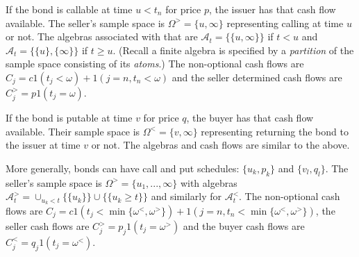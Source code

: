 \documentclass[12pt,letterpaper,fleqn]{report}
\begin{document}
If the bond is callable at time \(u < t_n\) for price \(p\), the issuer
has that cash flow available. The seller's sample space is \(\Omega^> = \{u,\infty\}\)
representing calling at time \(u\) or not. The algebras associated
with that are \(\mathcal{A}_t = \{\{u,\infty\}\}\) if \(t < u\)
and \(\mathcal{A}_t = \{\{u\},\{\infty\}\}\) if \(t\ge u\). (Recall a finite
algebra is specified by a {\em partition} of the sample space consisting
of its {\em atoms}.) 
The non-optional cash flows are 
\(C_j = c1(t_j < \omega) + 1(j = n, t_n < \omega)\) and the seller determined
cash flows are
\(C^>_j = p1(t_j = \omega)\).

If the bond is putable at time \(v\) for price \(q\), the buyer
has that cash flow available. Their sample space is \(\Omega^< = \{v,\infty\}\)
representing returning the bond to the issuer at time \(v\) or not. The
algebras and cash flows are similar to the above.

More generally, bonds can have call and put schedules: \(\{u_k,p_k\}\) and
\(\{v_l,q_l\}\). The seller's sample space is \(\Omega^> = \{u_1,...,\infty\}\)
with algebras \(\mathcal{A}^>_t = \cup_{u_k<t}\{\{u_k\}\}\cup\{\{u_k\ge t\}\}\)
and similarly for \(\mathcal{A}^<_t\). The non-optional cash flows are
\(C_j = c1(t_j < \min\{\omega^<,\omega^>\}) + 1(j = n, t_n < \min\{\omega^<,\omega^>\})\),
the seller cash flows are \(C_j^> = p_j1(t_j = \omega^>)\) and the buyer cash
flows are \(C_j^< = q_j1(t_j = \omega^<)\).
\end{document}
